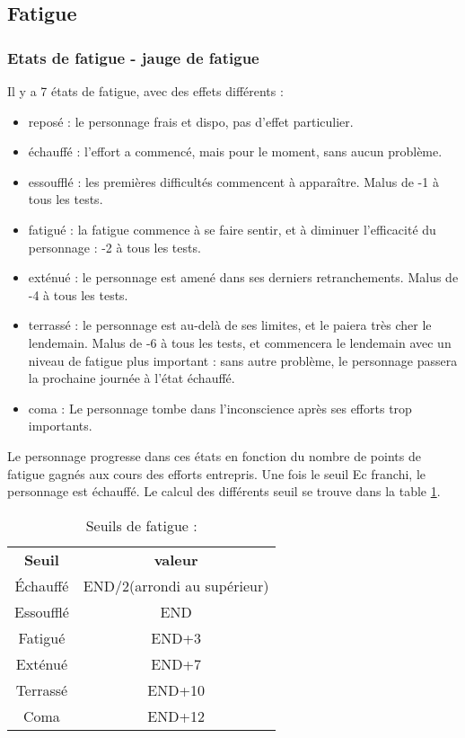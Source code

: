\documentclass[10pt,a4paper,twocolumn]{book}
\begin{document}
\subsection{Fatigue}
\subsubsection{Etats de fatigue - jauge de fatigue}
Il y  a 7 états de fatigue, avec des effets différents :

\begin{itemize}

\item{reposé} : le personnage frais et dispo, pas d’effet particulier.
\item{échauffé} : l’effort a commencé, mais pour le moment, sans aucun problème.
\item{essoufflé} : les premières difficultés commencent à apparaître. Malus de -1 à tous les tests.
\item{fatigué} : la fatigue commence à se faire sentir, et à diminuer l’efficacité du personnage : -2 à tous les tests.
\item{exténué} : le personnage est amené dans ses derniers retranchements. Malus de -4 à tous les tests.
\item{terrassé} : le personnage est au-delà de ses limites, et le paiera très cher le lendemain. Malus de -6 à tous les tests, et commencera le lendemain avec un niveau de fatigue plus important : sans autre problème, le personnage passera la prochaine journée à l’état échauffé.
\item{coma} : Le personnage tombe dans l’inconscience après ses efforts trop importants.
\end{itemize}
Le personnage progresse dans ces états en fonction du nombre de points de fatigue gagnés aux cours des efforts entrepris.
Une fois le seuil Ec franchi, le personnage est échauffé. 
Le calcul des différents seuil se trouve dans la table \ref{tableSeuilsFatigue}.

\begin{table}
\caption{ Seuils de fatigue :}
\label{tableSeuilsFatigue}
\begin{center}
\begin{tabular}{cc}
\textbf{Seuil} & \textbf{valeur} \\
   Échauffé & END/2(arrondi au supérieur)  \\
   Essoufflé & END  \\
   Fatigué & END+3 \\
   Exténué & END+7 \\
   Terrassé & END+10 \\
   Coma & END+12 \\
\end{tabular}
\end{center}
\end{table}
\end{document}
